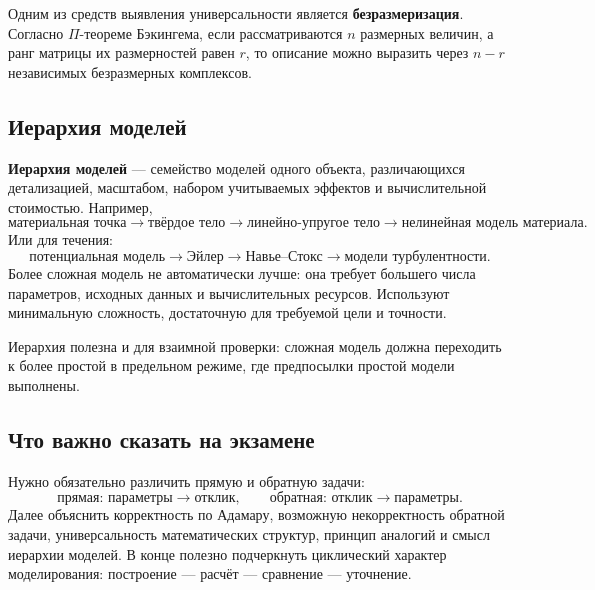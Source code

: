 Одним из средств выявления универсальности является \textbf{безразмеризация}. Согласно $\Pi$-теореме Бэкингема, если рассматриваются $n$ размерных величин, а ранг матрицы их размерностей равен $r$, то описание можно выразить через $n-r$ независимых безразмерных комплексов.

\subsection{Иерархия моделей}

\textbf{Иерархия моделей} --- семейство моделей одного объекта, различающихся детализацией, масштабом, набором учитываемых эффектов и вычислительной стоимостью. Например,
\[
\text{материальная точка}
\rightarrow
\text{твёрдое тело}
\rightarrow
\text{линейно-упругое тело}
\rightarrow
\text{нелинейная модель материала}.
\]
Или для течения:
\[
\text{потенциальная модель}
\rightarrow
\text{Эйлер}
\rightarrow
\text{Навье--Стокс}
\rightarrow
\text{модели турбулентности}.
\]
Более сложная модель не автоматически лучше: она требует большего числа параметров, исходных данных и вычислительных ресурсов. Используют минимальную сложность, достаточную для требуемой цели и точности.

Иерархия полезна и для взаимной проверки: сложная модель должна переходить к более простой в предельном режиме, где предпосылки простой модели выполнены.

\subsection{Что важно сказать на экзамене}

Нужно обязательно различить прямую и обратную задачи:
\[
\boxed{\text{прямая: параметры}\to\text{отклик},
\qquad
\text{обратная: отклик}\to\text{параметры}}.
\]
Далее объяснить корректность по Адамару, возможную некорректность обратной задачи, универсальность математических структур, принцип аналогий и смысл иерархии моделей. В конце полезно подчеркнуть циклический характер моделирования: построение --- расчёт --- сравнение --- уточнение.

\newpage
